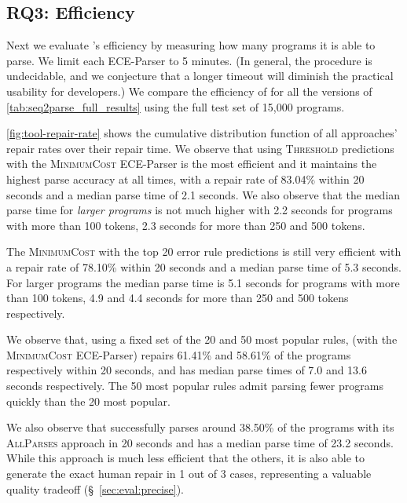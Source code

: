 \subsection{RQ3: Efficiency}
\label{sec:eval:efficiency}

Next we evaluate \toolname's efficiency by measuring how many programs it is
able to parse. We limit each ECE-Parser to 5 minutes. (In general, the procedure
is undecidable, and we conjecture that a longer timeout will diminish the
practical usability for developers.) We compare the efficiency of \toolname for
all the versions of \autoref{tab:seq2parse_full_results} using the full test set
of 15,000 programs.


\autoref{fig:tool-repair-rate} shows the cumulative distribution function of all
\toolname approaches' repair rates over their repair time. We observe that using
\textsc{Threshold} predictions with the \textsc{MinimumCost} ECE-Parser is the
most efficient and it maintains the highest parse accuracy at all times, with a
repair rate of 83.04\% within 20 seconds and a median parse time of 2.1 seconds.
We also observe that the median parse time for \emph{larger programs} is not
much higher with 2.2 seconds for programs with more than 100 tokens, 2.3 seconds
for more than 250 and 500 tokens.

The \textsc{MinimumCost} with the top 20 error rule predictions is still very
efficient with a repair rate of 78.10\% within 20 seconds and a median parse
time of 5.3 seconds. For larger programs the median parse time is 5.1 seconds
for programs with more than 100 tokens, 4.9 and 4.4 seconds for more than 250
and 500 tokens respectively.

We observe that, using a fixed set of the 20 and 50 most popular rules,
\toolname (with the \textsc{MinimumCost} ECE-Parser) repairs 61.41\% and 58.61\%
of the programs respectively within 20 seconds, and has median parse times of
7.0 and 13.6 seconds respectively. The 50 most popular rules admit parsing fewer
programs quickly than the 20 most popular.

We also observe that \toolname successfully parses around 38.50\% of the
programs with its \textsc{AllParses} approach in 20 seconds and has a median
parse time of 23.2 seconds. While this approach is much less efficient that the
others, it is also able to generate the exact human repair in 1 out of 3
cases, representing a valuable quality tradeoff (\S~\ref{sec:eval:precise}).

